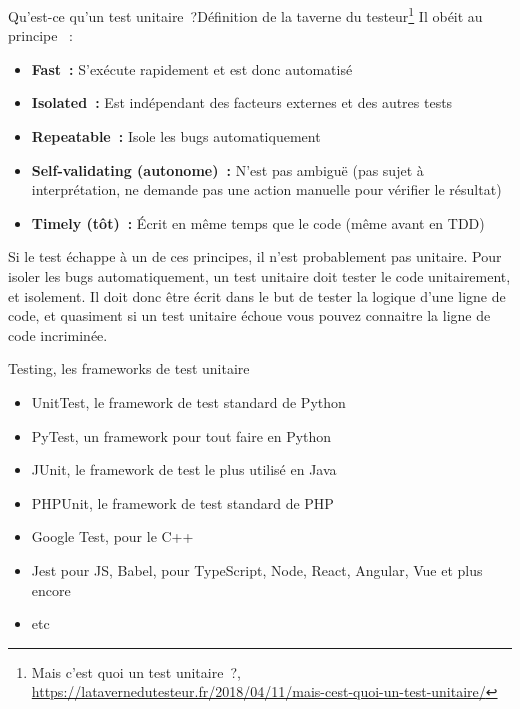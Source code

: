\documentclass{beamer}
\begin{document}
    \begin{frame}{Qu’est-ce qu’un test unitaire~?}{Définition de la taverne du testeur\footnote{Mais c’est quoi un test unitaire~?, \url{https://latavernedutesteur.fr/2018/04/11/mais-cest-quoi-un-test-unitaire/}}}
        \transdissolve
        Il obéit au principe ~:
        \begin{itemize}
            \item \textbf{Fast~:} S’exécute rapidement et est donc automatisé
            \item \textbf{Isolated~:} Est indépendant des facteurs externes et des autres tests
            \item \textbf{Repeatable~:} Isole les bugs automatiquement
            \item \textbf{Self-validating (autonome)~:} N’est pas ambiguë (pas sujet à interprétation, ne demande pas une action manuelle pour vérifier le résultat)
            \item \textbf{Timely (tôt)~:} Écrit en même temps que le code (même avant en TDD)
        \end{itemize}
        Si le test échappe à un de ces principes, il n'est probablement pas unitaire.
        \bigbreak
        Pour isoler les bugs automatiquement, un test unitaire doit tester le code unitairement, et isolement.
        Il doit donc être écrit dans le but de tester la logique d’une ligne de code, et quasiment si un test unitaire échoue vous pouvez connaitre la ligne de code incriminée.
    \end{frame}

    \begin{frame}{Testing, les frameworks de test unitaire}
        \begin{itemize}
            \item UnitTest, le framework de test standard de Python
            \item PyTest, un framework pour tout faire en Python
            \item JUnit, le framework de test le plus utilisé en Java
            \item PHPUnit, le framework de test standard de PHP
            \item Google Test, pour le C++
            \item Jest pour JS, Babel, pour TypeScript, Node, React, Angular, Vue et plus encore
            \item etc
        \end{itemize}
    \end{frame}
\end{document}
